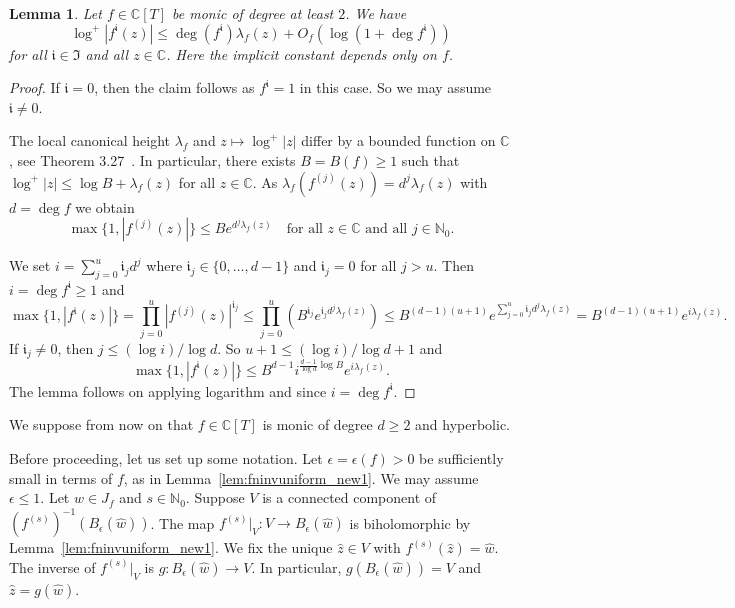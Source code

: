 \documentclass[12pt,oneside,a4]{amsart}
\newcommand{\IC}{\mathbb{C}}
\newcommand{\IN}{\mathbb{N}}
\newcounter{maincounter}
\numberwithin{maincounter}{section}
\numberwithin{equation}{section}
\newtheorem{lemma}[maincounter]{Lemma}
\begin{document}
\begin{lemma}
  \label{lem:fngrowthlambda}
  Let $f\in\IC[T]$ be monic of degree at least $2$. We have
  \begin{equation*}
    \log^+ |f^{\mathfrak{i}}(z)|\le \deg(f^{\mathfrak{i}})
\lambda_f(z) + O_f\left(\log(1+\deg f^{\mathfrak{i}})\right)
  \end{equation*}
  for all $\mathfrak{i}\in\mathfrak{I}$ and all $z\in\IC$. Here the
  implicit constant depends only on $f$. 
\end{lemma}
\begin{proof}
  If $\mathfrak{i}=0$, then the claim follows as $f^{\mathfrak{i}}=1$
  in this case. So we
  may assume $\mathfrak{i}\not=0$.
  
  The local canonical height $\lambda_f$ and $z\mapsto \log^+|z|$ differ by
  a bounded function on $\IC$, see  Theorem
  3.27~\cite{Silverman:gtm241}. In particular, 
  there exists $B=B(f)\ge 1$ such that $\log^+ |z| \le \log
  B+\lambda_f(z)$ for all $z\in\IC$. As $\lambda_f (f^{(j)}(z)) = d^j
  \lambda_f(z)$ with $d=\deg f$ we obtain
  \begin{equation*}
    \max\{1,|f^{(j)}(z)|\} \le B e^{ d^j \lambda_f(z)} \quad\text{for all
      $z\in\IC$ and all $j\in \IN_0$.}
  \end{equation*}
  
  We set
  $i = \sum_{j=0}^u \mathfrak{i}_j
  d^j$ where $\mathfrak{i}_j\in \{0,\ldots,d-1\}$
  and $\mathfrak{i}_j=0$ for all $j>u$. 
  Then $i = \deg f^{\mathfrak i}\ge 1$ and
  \begin{equation*}   
    \max\{1,|f^{\mathfrak{i}}(z)|\} = \prod_{j=0}^u
    |f^{(j)}(z)|^{\mathfrak{i}_j}
    \le \prod_{j=0}^u (B^{\mathfrak{i}_j} e^{\mathfrak{i}_j d^j\lambda_f(z)})
    \le B^{(d-1)(u+1)} e^{\sum_{j=0}^u\mathfrak{i}_j d^j \lambda_f(z)}
    =B^{(d-1)(u+1)} e^{i \lambda_f(z)}. 
  \end{equation*}
  If $\mathfrak{i}_j\not=0$, then $j \le (\log i)/\log d$.  So $u+1\le
  (\log i)/\log d+1$ and
  \begin{equation*}
    \max\{1,|f^{\mathfrak{i}}(z)|\}
    \le B^{d-1} i^{\frac{d-1}{\log d}\log B} e^{i \lambda_f(z)}.
  \end{equation*}
  The lemma follows on
  applying logarithm
  and since $i=\deg f^{\mathfrak i}$. 
\end{proof}


We suppose from now on that $f\in\IC[T]$ is monic of degree $d\ge 2$
and hyperbolic. 


Before proceeding, let us set up some notation. Let
$\epsilon=\epsilon(f)>0$ be sufficiently small in terms of $f$, as in 
Lemma~\ref{lem:fninvuniform_new1}. We may assume $\epsilon\le 1$.
Let $\widehat w\in J_{f}$ and $s\in\IN_0$.
Suppose $V$ is a connected component of
$(f^{(s)})^{-1}(B_{\epsilon}(\widehat w))$. 
The map
$f^{(s)}|_V\colon V\rightarrow B_{\epsilon}(\widehat w)$ is
biholomorphic by Lemma~\ref{lem:fninvuniform_new1}.
We fix the unique $\widehat z\in V$ with
$f^{(s)}(\widehat z)=\widehat w$. 
The inverse of $f^{(s)}|_V$ is
$g\colon B_{\epsilon}(\widehat w)\rightarrow V$.
In particular,  $g(B_\epsilon(\widehat w)) = V$ and $\widehat z =
g(\widehat w)$. 
\end{document}
